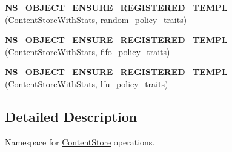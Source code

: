 \begin{DoxyCompactItemize}
\item 
{\bfseries N\+S\+\_\+\+O\+B\+J\+E\+C\+T\+\_\+\+E\+N\+S\+U\+R\+E\+\_\+\+R\+E\+G\+I\+S\+T\+E\+R\+E\+D\+\_\+\+T\+E\+M\+PL} (\hyperlink{classns3_1_1ndn_1_1cs_1_1ContentStoreWithStats}{Content\+Store\+With\+Stats}, random\+\_\+policy\+\_\+traits)\hypertarget{namespacens3_1_1ndn_1_1cs_a91ad44f35af7747bfed0f7b09759bc5e}{}\label{namespacens3_1_1ndn_1_1cs_a91ad44f35af7747bfed0f7b09759bc5e}

\item 
{\bfseries N\+S\+\_\+\+O\+B\+J\+E\+C\+T\+\_\+\+E\+N\+S\+U\+R\+E\+\_\+\+R\+E\+G\+I\+S\+T\+E\+R\+E\+D\+\_\+\+T\+E\+M\+PL} (\hyperlink{classns3_1_1ndn_1_1cs_1_1ContentStoreWithStats}{Content\+Store\+With\+Stats}, fifo\+\_\+policy\+\_\+traits)\hypertarget{namespacens3_1_1ndn_1_1cs_ae9636508513637c9b6ec311fb7d3df37}{}\label{namespacens3_1_1ndn_1_1cs_ae9636508513637c9b6ec311fb7d3df37}

\item 
{\bfseries N\+S\+\_\+\+O\+B\+J\+E\+C\+T\+\_\+\+E\+N\+S\+U\+R\+E\+\_\+\+R\+E\+G\+I\+S\+T\+E\+R\+E\+D\+\_\+\+T\+E\+M\+PL} (\hyperlink{classns3_1_1ndn_1_1cs_1_1ContentStoreWithStats}{Content\+Store\+With\+Stats}, lfu\+\_\+policy\+\_\+traits)\hypertarget{namespacens3_1_1ndn_1_1cs_a4326a8369adf0894afe9d4fff46cfeb6}{}\label{namespacens3_1_1ndn_1_1cs_a4326a8369adf0894afe9d4fff46cfeb6}

\end{DoxyCompactItemize}


\subsection{Detailed Description}
Namespace for \hyperlink{classns3_1_1ndn_1_1ContentStore}{Content\+Store} operations. 